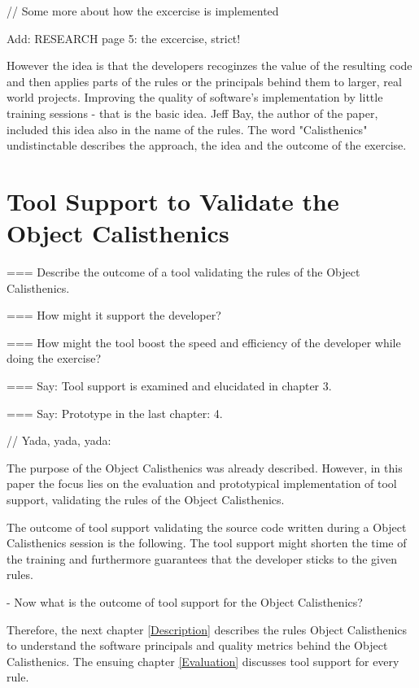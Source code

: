 \begin{itshape}
// Some more about how the excercise is  implemented

Add: RESEARCH page 5: the excercise, strict!

However the idea is that the developers recoginzes the value of the resulting code and then applies parts of the rules or the principals behind them to larger, real world projects. 
Improving the quality of software's implementation by little training sessions - that is the basic idea. Jeff Bay, the author of the paper, included this idea also in the name of the rules. The word "Calisthenics" undistinctable describes the approach, the idea and the outcome of the exercise.
\end{itshape}

\section{Tool Support to Validate the Object Calisthenics}

=== Describe the outcome of a tool validating the rules of the Object Calisthenics.

=== How might it support the developer?

=== How might the tool boost the speed and efficiency of the developer while doing the exercise?

=== Say: Tool support is examined and elucidated in chapter 3.

=== Say: Prototype in the last chapter: 4. 


\begin{itshape}
// Yada, yada, yada: 

The purpose of the Object Calisthenics was already described. However, in this paper the focus lies on the evaluation and prototypical implementation of tool support, validating the rules of the Object Calisthenics. 

The outcome of tool support validating the source code written during a Object Calisthenics session is the following. The tool support might shorten the time of the training and furthermore guarantees that the developer sticks to the given rules. 

- Now what is the outcome of tool support for the Object Calisthenics?

Therefore, the next chapter  \ref{Description} describes the rules Object Calisthenics to understand the software principals and quality metrics behind the Object Calisthenics. 
The ensuing chapter \ref{Evaluation} discusses tool support for every rule. 
\end{itshape}

